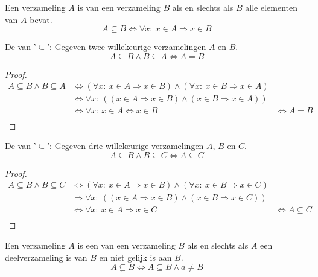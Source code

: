 \documentclass[main.tex]{subfiles}
\begin{document}
\begin{de}
  Een verzameling $A$ is  van een verzameling $B$ als en slechts als $B$ alle elementen van $A$ bevat.
  \[ A \subseteq B \Leftrightarrow \forall x:\ x \in A \Rightarrow x \in B\]
\end{de}

\begin{st}
  De  van '$\subseteq$': Gegeven twee willekeurige verzamelingen $A$ en $B$.
  \[ A \subseteq B \wedge B \subseteq A  \Leftrightarrow A = B \]
  \begin{proof}
    \[
    \begin{array}{cll}
      A \subseteq B \wedge B \subseteq A &\Leftrightarrow (\forall x:\ x \in A \Rightarrow x \in B) \wedge (\forall x:\ x \in B \Rightarrow x \in A) &\\
      & \Leftrightarrow \forall x:\ ((x \in A \Rightarrow x \in B) \wedge (x \in B \Rightarrow x \in A)) &\\
      & \Leftrightarrow \forall x:\ x \in A \Leftrightarrow x \in B &\Leftrightarrow A = B  \\
    \end{array}
    \]
  \end{proof}
\end{st}

\begin{st}
  De  van '$\subseteq$': Gegeven drie willekeurige verzamelingen $A$, $B$ en $C$.
  \[ A \subseteq B \wedge B \subseteq C  \Leftrightarrow A \subseteq C \]
  \begin{proof}
    \[
    \begin{array}{cll}
      A \subseteq B \wedge B \subseteq C &\Leftrightarrow (\forall x:\ x \in A \Rightarrow x \in B) \wedge (\forall x:\ x \in B \Rightarrow x \in C) &\\
      & \Rightarrow \forall x:\ ((x \in A \Rightarrow x \in B) \wedge (x \in B \Rightarrow x \in C)) &\\
      & \Leftrightarrow \forall x:\ x \in A \Rightarrow x \in C &\Leftrightarrow A \subseteq C  \\
    \end{array}
    \]
  \end{proof}
\end{st}

\begin{de}
  Een verzameling $A$ is een  van een verzameling $B$ als en slechts als $A$ een deelverzameling is van $B$ en niet gelijk is aan $B$.
  \[ A \subsetneq B \Leftrightarrow A \subseteq B \wedge a \neq B \]
\end{de}
\end{document}
